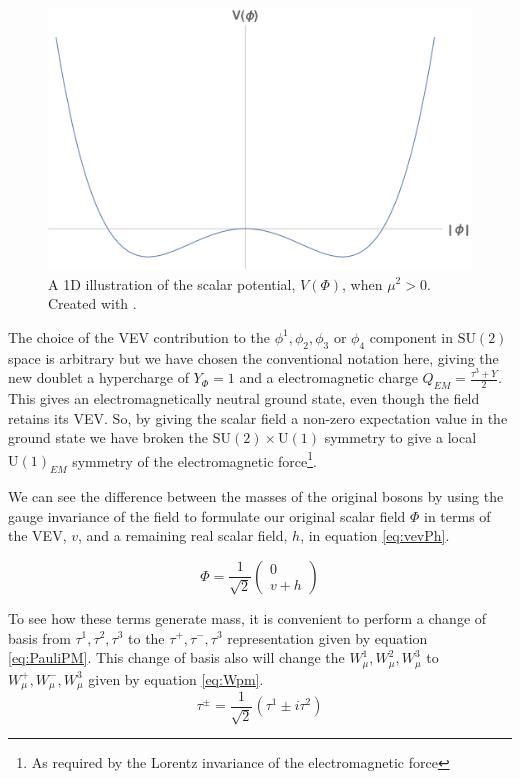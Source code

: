 \begin{figure}
\begin{center}
\includegraphics[width=0.75\linewidth]{Introduction/Mexican_Hat_1D.pdf}
\caption[A 1D illustration of the scalar potential, $V\left(\Phi\right)$, when $\mu^2 > 0$.]{A 1D illustration of the scalar potential, $V\left(\Phi\right)$, when $\mu^2 > 0$. Created with \cite{Mathematica10_1}.}
\label{fig:1Dbroken}
\end{center}
\end{figure}

The choice of the VEV contribution to the $\phi^{1}, \phi_{2}, \phi_{3} \text{ or } \phi_{4}$ component in $\mathrm{SU}(2)$ space is arbitrary but we have chosen the conventional notation here, giving the new doublet a hypercharge of $Y_{\Phi} = 1$ and a electromagnetic charge $Q_{EM} = \frac{\tau^{3} + Y}{2}$. This gives an electromagnetically neutral ground state, even though the field retains its VEV. So, by giving the scalar field a non-zero expectation value in the ground state we have broken the $\mathrm{SU}(2) \times \mathrm{U}(1)$ symmetry to give a local $\mathrm{U}(1)_{EM}$ symmetry of the electromagnetic force\footnote{As required by the Lorentz invariance of the electromagnetic force}.

We can see the difference between the masses of the original bosons by using the gauge invariance of the field to formulate our original scalar field $\Phi$ in terms of the VEV, $v$, and a remaining real scalar field, $h$, in equation \eqref{eq:vevPh}.

\begin{equation}
\label{eq:vevPh}
\Phi =  \frac{1}{\sqrt{2}} \begin{pmatrix} 0 \\ v + h \end{pmatrix}
\end{equation}

To see how these terms generate mass, it is convenient to perform a change of basis from $\tau^{1}, \tau^{2}, \tau^{3}$ to the $\tau^{+}, \tau^{-}, \tau^{3}$ representation given by equation \eqref{eq:PauliPM}. This change of basis also will change the $W^{1}_{\mu}, W^{2}_{\mu}, W^{3}_{\mu}$ to  $W^{+}_{\mu}, W^{-}_{\mu}, W^{3}_{\mu}$ given by equation \eqref{eq:Wpm}.
\begin{equation}
\label{eq:PauliPM}
\tau^{\pm}  =  \frac{1}{\sqrt{2}}\left(\tau^{1} \pm i \tau^{2}\right)
\end{equation}


